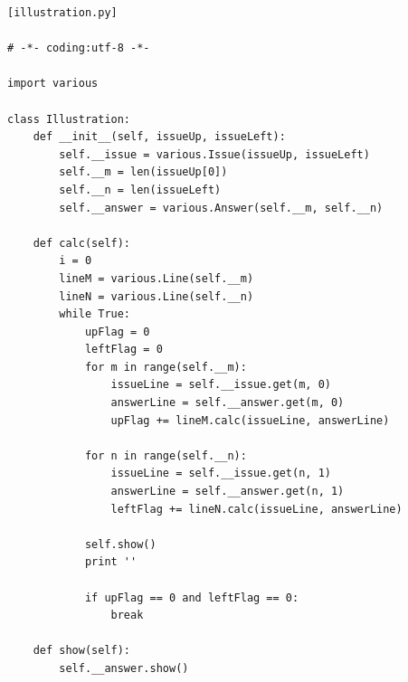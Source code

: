 \documentclass[a4j]{jarticle}
\begin{document}
\begin{lstlisting}[basicstyle=\ttfamily\footnotesize, frame=single]
[illustration.py]

# -*- coding:utf-8 -*-

import various

class Illustration:
    def __init__(self, issueUp, issueLeft):
        self.__issue = various.Issue(issueUp, issueLeft)
        self.__m = len(issueUp[0])
        self.__n = len(issueLeft)
        self.__answer = various.Answer(self.__m, self.__n)

    def calc(self):
        i = 0
        lineM = various.Line(self.__m)
        lineN = various.Line(self.__n)
        while True:
            upFlag = 0
            leftFlag = 0
            for m in range(self.__m):
                issueLine = self.__issue.get(m, 0)
                answerLine = self.__answer.get(m, 0)
                upFlag += lineM.calc(issueLine, answerLine)

            for n in range(self.__n):
                issueLine = self.__issue.get(n, 1)
                answerLine = self.__answer.get(n, 1)
                leftFlag += lineN.calc(issueLine, answerLine)

            self.show()
            print ''

            if upFlag == 0 and leftFlag == 0:
                break

    def show(self):
        self.__answer.show()
\end{lstlisting}
\end{document}
